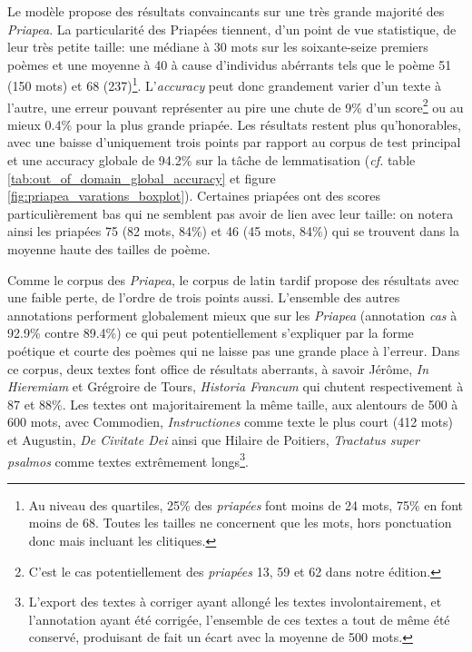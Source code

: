 Le modèle propose des résultats convaincants sur une très grande majorité des \textit{Priapea}. La particularité des Priapées tiennent, d'un point de vue statistique, de leur très petite taille: une médiane à 30 mots sur les soixante-seize premiers poèmes et une moyenne à 40 à cause d'individus abérrants tels que le poème 51 (150 mots) et 68 (237)\footnote{Au niveau des quartiles, 25\% des \textit{priapées} font moins de 24 mots, 75\% en font moins de 68. Toutes les tailles ne concernent que les mots, hors ponctuation donc mais incluant les clitiques.}. L'\textit{accuracy} peut donc grandement varier d'un texte à l'autre, une erreur pouvant représenter au pire une chute de 9\% d'un score\footnote{C'est le cas potentiellement des \textit{priapées} 13, 59 et 62 dans notre édition.} ou au mieux 0.4\% pour la plus grande priapée. Les résultats restent plus qu'honorables, avec une baisse d'uniquement trois points par rapport au corpus de test principal et une accuracy globale de 94.2\% sur la tâche de lemmatisation (\textit{cf.} table \ref{tab:out_of_domain_global_accuracy} et figure \ref{fig:priapea_varations_boxplot}). Certaines priapées ont des scores particulièrement bas qui ne semblent pas avoir de lien avec leur taille: on notera ainsi les priapées 75 (82 mots, 84\%) et 46 (45 mots, 84\%) qui se trouvent dans la moyenne haute des tailles de poème.

Comme le corpus des \textit{Priapea}, le corpus de latin tardif propose des résultats avec une faible perte, de l'ordre de trois points aussi. L'ensemble des autres annotations performent globalement mieux que sur les \textit{Priapea} (annotation \textit{cas} à 92.9\% contre 89.4\%) ce qui peut potentiellement s'expliquer par la forme poétique et courte des poèmes qui ne laisse pas une grande place à l'erreur. Dans ce corpus, deux textes font office de résultats aberrants, à savoir Jérôme, \textit{In Hieremiam} et Grégroire de Tours, \textit{Historia Francum} qui chutent respectivement à 87 et 88\%. Les textes ont majoritairement la même taille, aux alentours de 500 à 600 mots, avec Commodien, \textit{Instructiones} comme texte le plus court (412 mots) et Augustin, \textit{De Civitate Dei} ainsi que Hilaire de Poitiers, \textit{Tractatus super psalmos} comme textes extrêmement longs\footnote{L'export des textes à corriger ayant allongé les textes involontairement, et l'annotation ayant été corrigée, l'ensemble de ces textes a tout de même été conservé, produisant de fait un écart avec la moyenne de 500 mots.}.

